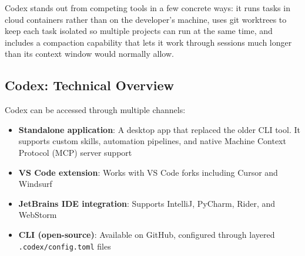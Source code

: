 \documentclass[conference]{IEEEtran}
\begin{document}
Codex stands out from competing tools in a few concrete ways: it runs tasks in cloud containers rather than on the developer's machine, uses git worktrees to keep each task isolated so multiple projects can run at the same time, and includes a compaction capability that lets it work through sessions much longer than its context window would normally allow.

\subsection{Codex: Technical Overview}
Codex can be accessed through multiple channels:
\begin{itemize}
    \item \textbf{Standalone application}: A desktop app that replaced the older CLI tool. It supports custom skills, automation pipelines, and native Machine Context Protocol (MCP) server support \cite{openai_codex_docs}
    \item \textbf{VS Code extension}: Works with VS Code forks including Cursor and Windsurf \cite{openai_codex_docs}
    \item \textbf{JetBrains IDE integration}: Supports IntelliJ, PyCharm, Rider, and WebStorm \cite{openai_codex_docs}
    \item \textbf{CLI (open-source)}: Available on GitHub, configured through layered \texttt{.codex/config.toml} files
\end{itemize}
\end{document}
